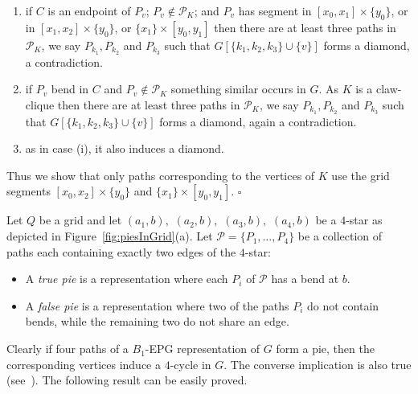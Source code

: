 \documentclass[9pt]{entcs}
\newtheorem{defi}{Definition}[section]
\begin{document}
\begin{pf}
\begin{enumerate}[label=(\roman*)]
    \item if $C$ is an endpoint of $P_v$; $P_v \notin \mathcal{P}_K$; and $P_v$ has segment in  $[x_0, x_1] \times \{y_0\}$, or in $[x_1, x_2] \times \{y_0\}$, or $\{x_1\} \times [y_0, y_1]$ then there are at least three paths in $\mathcal{P}_K$, we say $P_{k_1}, P_{k_2}$ and $P_{k_3}$ such that $G[\{k_1, k_2, k_3\}\cup \{v\}]$ forms a diamond, a contradiction.
    \item if $P_v$ bend in $C$ and $P_v \notin \mathcal{P}_K$ something similar occurs in $G$. As $K$ is a claw-clique then there are at least three paths in $\mathcal{P}_K$, we say $P_{k_1}, P_{k_2}$ and $P_{k_3}$ such that $G[\{k_1, k_2, k_3\}\cup \{v\}]$ forms a diamond, again a contradiction.
    \item as in case (i), it also induces a diamond. 
\end{enumerate}
Thus we show that only paths corresponding to the vertices of $K$ use the grid segments $[x_0, x_2]\times\{y_ 0\}$ and $\{x_1\}\times[y_ 0, y_ 1]$.
$\square$
\end{pf}



Let $ Q $ be a grid and let $ (a_1, b),$ $(a_2, b),$ $(a_3, b),$ $(a_4, b)$ be a $4$-star as depicted in Figure~\ref{fig:piesInGrid}(a). Let $ \mathcal{P} = \{P_1, \dots , P_4\}$ be a collection of paths each containing exactly two edges of the $4$-star:

\begin{itemize}
\item A \emph{true pie} is a representation where each $P_i$ of $ \mathcal{P} $ has a bend at $b$.

\item A \emph {false pie} is a representation where two of the paths $P_i$ do not contain bends, while the remaining two do not share an edge. 

%


\end{itemize}

Clearly if four paths of a $B_1$-EPG representation of $G$ form a pie, then the corresponding vertices induce a $4$-cycle in $G$. The converse implication is also true (see~\cite{golumbic2009}). The following result can be easily proved.
\end{document}
